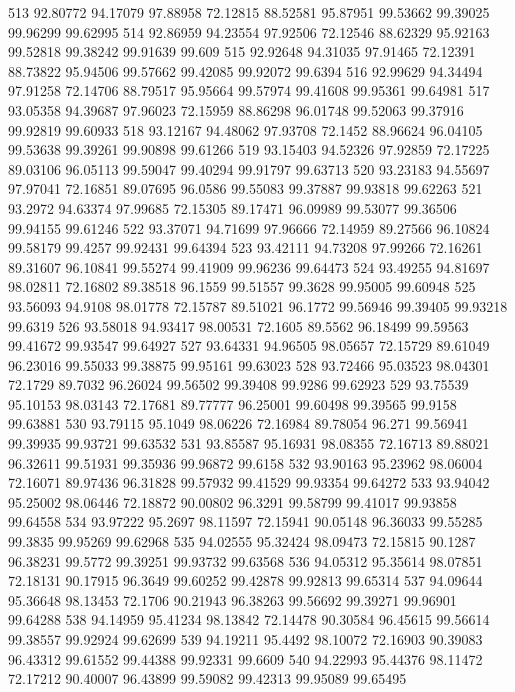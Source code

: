 513	92.80772	94.17079	97.88958	72.12815	88.52581	95.87951	99.53662	99.39025	99.96299	99.62995
514	92.86959	94.23554	97.92506	72.12546	88.62329	95.92163	99.52818	99.38242	99.91639	99.609
515	92.92648	94.31035	97.91465	72.12391	88.73822	95.94506	99.57662	99.42085	99.92072	99.6394
516	92.99629	94.34494	97.91258	72.14706	88.79517	95.95664	99.57974	99.41608	99.95361	99.64981
517	93.05358	94.39687	97.96023	72.15959	88.86298	96.01748	99.52063	99.37916	99.92819	99.60933
518	93.12167	94.48062	97.93708	72.1452	88.96624	96.04105	99.53638	99.39261	99.90898	99.61266
519	93.15403	94.52326	97.92859	72.17225	89.03106	96.05113	99.59047	99.40294	99.91797	99.63713
520	93.23183	94.55697	97.97041	72.16851	89.07695	96.0586	99.55083	99.37887	99.93818	99.62263
521	93.2972	94.63374	97.99685	72.15305	89.17471	96.09989	99.53077	99.36506	99.94155	99.61246
522	93.37071	94.71699	97.96666	72.14959	89.27566	96.10824	99.58179	99.4257	99.92431	99.64394
523	93.42111	94.73208	97.99266	72.16261	89.31607	96.10841	99.55274	99.41909	99.96236	99.64473
524	93.49255	94.81697	98.02811	72.16802	89.38518	96.1559	99.51557	99.3628	99.95005	99.60948
525	93.56093	94.9108	98.01778	72.15787	89.51021	96.1772	99.56946	99.39405	99.93218	99.6319
526	93.58018	94.93417	98.00531	72.1605	89.5562	96.18499	99.59563	99.41672	99.93547	99.64927
527	93.64331	94.96505	98.05657	72.15729	89.61049	96.23016	99.55033	99.38875	99.95161	99.63023
528	93.72466	95.03523	98.04301	72.1729	89.7032	96.26024	99.56502	99.39408	99.9286	99.62923
529	93.75539	95.10153	98.03143	72.17681	89.77777	96.25001	99.60498	99.39565	99.9158	99.63881
530	93.79115	95.1049	98.06226	72.16984	89.78054	96.271	99.56941	99.39935	99.93721	99.63532
531	93.85587	95.16931	98.08355	72.16713	89.88021	96.32611	99.51931	99.35936	99.96872	99.6158
532	93.90163	95.23962	98.06004	72.16071	89.97436	96.31828	99.57932	99.41529	99.93354	99.64272
533	93.94042	95.25002	98.06446	72.18872	90.00802	96.3291	99.58799	99.41017	99.93858	99.64558
534	93.97222	95.2697	98.11597	72.15941	90.05148	96.36033	99.55285	99.3835	99.95269	99.62968
535	94.02555	95.32424	98.09473	72.15815	90.1287	96.38231	99.5772	99.39251	99.93732	99.63568
536	94.05312	95.35614	98.07851	72.18131	90.17915	96.3649	99.60252	99.42878	99.92813	99.65314
537	94.09644	95.36648	98.13453	72.1706	90.21943	96.38263	99.56692	99.39271	99.96901	99.64288
538	94.14959	95.41234	98.13842	72.14478	90.30584	96.45615	99.56614	99.38557	99.92924	99.62699
539	94.19211	95.4492	98.10072	72.16903	90.39083	96.43312	99.61552	99.44388	99.92331	99.6609
540	94.22993	95.44376	98.11472	72.17212	90.40007	96.43899	99.59082	99.42313	99.95089	99.65495
